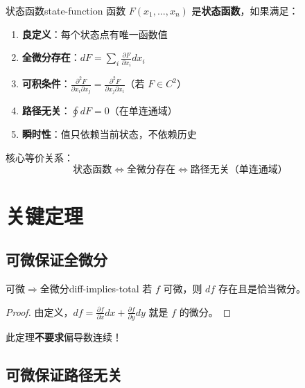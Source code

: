 \documentclass[12pt,a4paper]{article}
\begin{document}
\begin{definition}{状态函数}{state-function}
函数 $F(x_1, \ldots, x_n)$ 是\textbf{状态函数}，如果满足：
\begin{enumerate}
\item \textbf{良定义}：每个状态点有唯一函数值
\item \textbf{全微分存在}：$dF = \sum_i \frac{\partial F}{\partial x_i}dx_i$
\item \textbf{可积条件}：$\frac{\partial^2 F}{\partial x_i \partial x_j} = \frac{\partial^2 F}{\partial x_j \partial x_i}$（若 $F \in C^2$）
\item \textbf{路径无关}：$\oint dF = 0$（在单连通域）
\item \textbf{瞬时性}：值只依赖当前状态，不依赖历史
\end{enumerate}
\end{definition}

\begin{keypoint}
核心等价关系：
\begin{equation}
\boxed{\text{状态函数} \Leftrightarrow \text{全微分存在} \Leftrightarrow \text{路径无关（单连通域）}}
\end{equation}
\end{keypoint}

\section{关键定理}

\subsection{可微保证全微分}

\begin{theorem}{可微$\Rightarrow$全微分}{diff-implies-total}
若 $f$ 可微，则 $df$ 存在且是恰当微分。
\end{theorem}

\begin{proof}
由定义，$df = \frac{\partial f}{\partial x}dx + \frac{\partial f}{\partial y}dy$ 就是 $f$ 的微分。
\end{proof}

\begin{warning}
此定理\textbf{不要求}偏导数连续！
\end{warning}

\subsection{可微保证路径无关}
\end{document}
